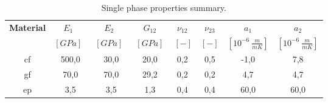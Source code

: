 \begin{table}[htbp]
  \centering
  \caption{Single phase properties summary.}
    \begin{tabular}{cccccccc}
    \toprule
    \textbf{Material} & \textbf{$E_{1}$}\ & \textbf{$E_{2}$}\ & \textbf{$G_{12}$} & \textbf{$\nu_{12}$} & \textbf{$\nu_{23}$} & \textbf{$a_{1}$} & \textbf{$a_{2}$} \\
   & \textbf{$\left[GPa\right]$}\ & \textbf{$\left[GPa\right]$}\ & \textbf{$\left[GPa\right]$} & \textbf{$\ \left[-\right]$} & \textbf{$\left[-\right]$} & \textbf{$\left[10^{-6}\  \frac{m}{mK}\right]$} & \textbf{$\left[10^{-6}\  \frac{m}{mK}\right]$} \\
    \midrule
    \acrshort{cf}    & 500,0 & 30,0  & 20,0  & 0,2   & 0,5   & -1,0  & 7,8 \\
    \acrshort{gf}    & 70,0  & 70,0  & 29,2  & 0,2   & 0,2   & 4,7   & 4,7 \\
    \acrshort{ep}    & 3,5   & 3,5   & 1,3   & 0,4   & 0,4   & 60,0  & 60,0 \\
    \bottomrule
    \end{tabular}%
  \label{tab:phaseprop}%
\end{table}%
